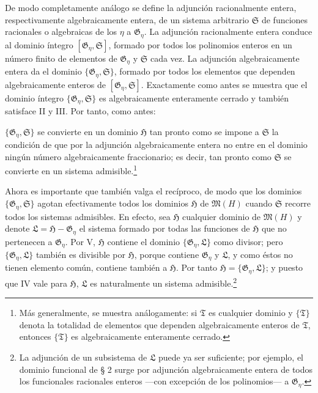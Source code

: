 De modo completamente análogo se define la adjunción racionalmente entera, respectivamente algebraicamente entera, de un sistema arbitrario $\mathfrak S$ de funciones racionales o algebraicas de los $\eta$ a $\mathfrak G_\eta$. La adjunción racionalmente entera conduce al dominio íntegro $[\mathfrak G_\eta,\mathfrak S]$, formado por todos los polinomios enteros en un número finito de elementos de $\mathfrak G_\eta$ y $\mathfrak S$ cada vez. La adjunción algebraicamente entera da el dominio $\{\mathfrak G_\eta,\mathfrak S\}$, formado por todos los elementos que dependen algebraicamente enteros de $[\mathfrak G_\eta,\mathfrak S]$. Exactamente como antes se muestra que el dominio íntegro $\{\mathfrak G_\eta,\mathfrak S\}$ es algebraicamente enteramente cerrado y también satisface II y III. Por tanto, como antes:

$\{\mathfrak G_\eta,\mathfrak S\}$ se convierte en un dominio $\mathfrak H$ tan pronto como se impone a $\mathfrak S$ la condición de que por la adjunción algebraicamente entera no entre en el dominio ningún número algebraicamente fraccionario; es decir, tan pronto como $\mathfrak S$ se convierte en un sistema admisible.\footnote{Más generalmente, se muestra análogamente: si $\mathfrak T$ es cualquier dominio y $\{\mathfrak T\}$ denota la totalidad de elementos que dependen algebraicamente enteros de $\mathfrak T$, entonces $\{\mathfrak T\}$ es algebraicamente enteramente cerrado.}

Ahora es importante que también valga el recíproco, de modo que los dominios $\{\mathfrak G_\eta,\mathfrak S\}$ agotan efectivamente todos los dominios $\mathfrak H$ de $\mathfrak M(H)$ cuando $\mathfrak S$ recorre todos los sistemas admisibles. En efecto, sea $\mathfrak H$ cualquier dominio de $\mathfrak M(H)$ y denote $\mathfrak L=\mathfrak H-\mathfrak G_\eta$ el sistema formado por todas las funciones de $\mathfrak H$ que no pertenecen a $\mathfrak G_\eta$. Por V, $\mathfrak H$ contiene el dominio $\{\mathfrak G_\eta,\mathfrak L\}$ como divisor; pero $\{\mathfrak G_\eta,\mathfrak L\}$ también es divisible por $\mathfrak H$, porque contiene $\mathfrak G_\eta$ y $\mathfrak L$, y como éstos no tienen elemento común, contiene también a $\mathfrak H$. Por tanto $\mathfrak H=\{\mathfrak G_\eta,\mathfrak L\}$; y puesto que IV vale para $\mathfrak H$, $\mathfrak L$ es naturalmente un sistema admisible.\footnote{La adjunción de un subsistema de $\mathfrak L$ puede ya ser suficiente; por ejemplo, el dominio funcional de § 2 surge por adjunción algebraicamente entera de todos los funcionales racionales enteros ---con excepción de los polinomios--- a $\mathfrak G_\eta$.}

